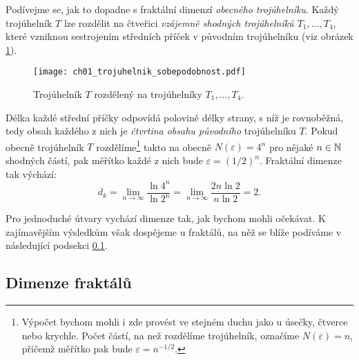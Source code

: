 \begin{example}\label{ex:fraktalni-dimenze-trojuhelnik}
    Podívejme se, jak to dopadne s fraktální dimenzí \emph{obecného trojúhelníku}. Každý trojúhelník $T$ lze rozdělit na čtveřici \emph{vzájemně shodných trojúhelníků $T_1,\dots,T_4$}, které vzniknou sestrojením středních příček v původním trojúhelníku (viz obrázek \ref{fig:trojuhelnik-sobepodobnost}).
    \begin{figure}[h]
        \centering
        \texttt{[image: ch01\_trojuhelnik\_sobepodobnost.pdf]}
        \caption{Trojúhelník $T$ rozdělený na trojúhelníky $T_1,\dots,T_4$.}
        \label{fig:trojuhelnik-sobepodobnost}
    \end{figure}
    Délka každé střední příčky odpovídá polovině délky strany, s níž je rovnoběžná, tedy obsah každého z nich je \emph{čtvrtina obsahu původního} trojúhelníku $T$. Pokud obecně trojúhelník $T$ rozdělíme\footnote{Výpočet bychom mohli i zde provést ve stejném duchu jako u úsečky, čtverce nebo krychle. Počet částí, na než rozdělíme trojúhelník, označíme $N(\varepsilon)=n$, přičemž měřítko pak bude $\varepsilon=n^{-1/2}$.} takto na obecně $N(\varepsilon)=4^n$ pro nějaké $n\in\mathbb{N}$ shodných částí, pak měřítko každé z nich bude $\varepsilon=(1/2)^n$. Fraktální dimenze tak výchází:
    \[d_k=\lim_{n\to\infty}{\dfrac{\ln{4^n}}{\ln{2^n}}}=\lim_{n\to\infty}{\dfrac{2n\ln{2}}{n\ln{2}}}=2.\]
\end{example}
Pro jednoduché útvary vychází dimenze tak, jak bychom mohli očekávat. K zajímavějším výsledkům však dospějeme u fraktálů, na něž se blíže podíváme v následující podsekci \ref{subsec:dimenze-fraktalu}.

\subsection{Dimenze fraktálů}\label{subsec:dimenze-fraktalu}

